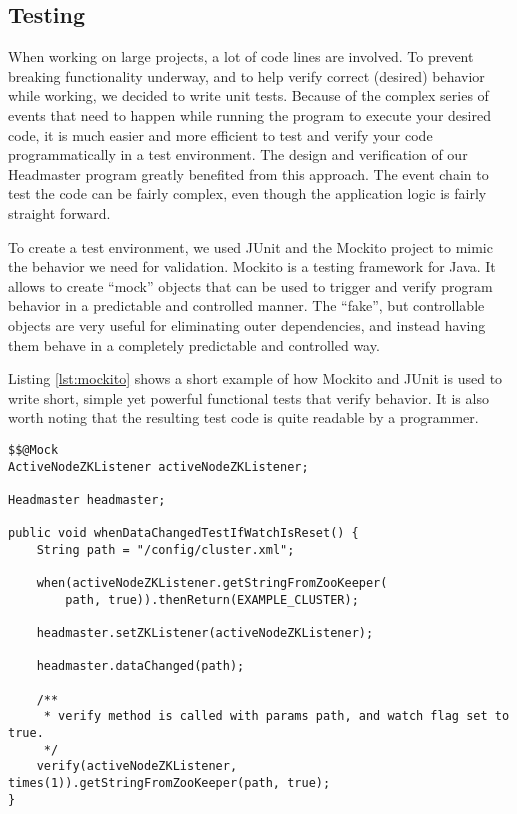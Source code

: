\subsection{Testing}
When working on large projects, a lot of code lines are involved. To prevent breaking functionality underway, and to help verify correct (desired) behavior while working, we decided to write unit tests. 
Because of the complex series of events that need to happen while running the program to execute your desired code, it is much easier and more efficient to test and verify your code programmatically in a test environment. The design and verification of our Headmaster program greatly benefited from this approach. The event chain to test the code can be fairly complex, even though the application logic is fairly straight forward.

To create a test environment, we used JUnit and the Mockito project to mimic the behavior we need for validation.
Mockito is a testing framework for Java. It allows to create ``mock'' objects that can be used to trigger and verify program behavior in a predictable and controlled manner. The ``fake'', but controllable objects are very useful for eliminating outer dependencies, and instead having them behave in a completely predictable and controlled way.

Listing \ref{lst:mockito} shows a short example of how Mockito and JUnit is used to write short, simple yet powerful functional tests that verify behavior. It is also worth noting that the resulting test code is quite readable by a programmer.

\begin{lstlisting}[style=customjava,label=lst:mockito,caption={Test code utilizing Mockito. Think of the \texttt{@Mock} class as a subclass with all methods overrided \texttt{return null;}.}]
$$@Mock
ActiveNodeZKListener activeNodeZKListener;

Headmaster headmaster;

public void whenDataChangedTestIfWatchIsReset() {
    String path = "/config/cluster.xml";

    when(activeNodeZKListener.getStringFromZooKeeper(
    	path, true)).thenReturn(EXAMPLE_CLUSTER);

    headmaster.setZKListener(activeNodeZKListener);

    headmaster.dataChanged(path);

    /** 
     * verify method is called with params path, and watch flag set to true.
     */
    verify(activeNodeZKListener, times(1)).getStringFromZooKeeper(path, true);
}

\end{lstlisting}

